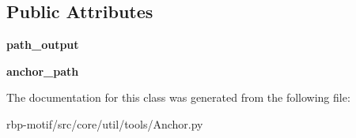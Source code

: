 \subsection*{Public Attributes}
\begin{DoxyCompactItemize}
\item 
\hypertarget{classsrc_1_1core_1_1util_1_1tools_1_1Anchor_1_1Anchor_af008cec38f021e0777788d68f5123b2f}{{\bfseries path\-\_\-output}}\label{classsrc_1_1core_1_1util_1_1tools_1_1Anchor_1_1Anchor_af008cec38f021e0777788d68f5123b2f}

\item 
\hypertarget{classsrc_1_1core_1_1util_1_1tools_1_1Anchor_1_1Anchor_a1ab978aba18228a45c71e1efacc5e40a}{{\bfseries anchor\-\_\-path}}\label{classsrc_1_1core_1_1util_1_1tools_1_1Anchor_1_1Anchor_a1ab978aba18228a45c71e1efacc5e40a}

\end{DoxyCompactItemize}


The documentation for this class was generated from the following file\-:\begin{DoxyCompactItemize}
\item 
rbp-\/motif/src/core/util/tools/Anchor.\-py\end{DoxyCompactItemize}
